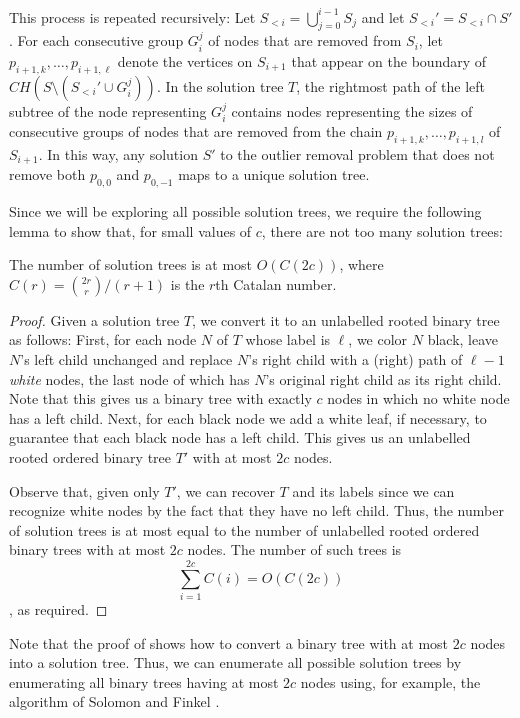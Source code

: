 \documentclass{elsart}
\begin{document}
This process is repeated recursively: Let
$S_{<i}=\bigcup_{j=0}^{i-1}S_j$ and let $S_{<i}'=S_{<i}\cap S'$.  For
each consecutive group $G_i^j$ of nodes that are removed from $S_i$,
let $p_{i+1,k}, \ldots, p_{i+1,\ell}$ denote the vertices on $S_{i+1}$
that appear on the boundary of $CH(S \setminus (S_{<i}'\cup G_i^j))$.
In the solution tree $T$, the rightmost path of the left subtree of
the node representing $G_i^j$ contains nodes representing the sizes of
consecutive groups of nodes that are removed from the chain
$p_{i+1,k}, \ldots, p_{i+1,l}$ of $S_{i+1}$.  In this way, any
solution $S'$ to the outlier removal problem that does not remove both
$p_{0,0}$ and $p_{0,-1}$ maps to a unique solution tree.

Since we will be exploring all possible solution trees, we require the
following lemma to show that, for small values of $c$, there are not
too many solution trees:
 
\begin{lem}
The number of solution trees is at most $O(C(2c))$, where
$C(r)={2r\choose r}/(r+1)$ is the $r$th Catalan number.
\end{lem}

\begin{proof} Given a solution tree $T$, we convert it to an
unlabelled rooted binary tree as follows: First, for each node $N$ of
$T$ whose label is $\ell$, we color $N$ black, leave $N$'s left child
unchanged and replace $N$'s right child with a (right) path of
$\ell-1$ \emph{white} nodes, the last node of which has $N$'s original
right child as its right child.  Note that this gives us a binary tree
with exactly $c$ nodes in which no white node has a left child.  Next,
for each black node we add a white leaf, if necessary, to guarantee
that each black node has a left child.  This gives us an unlabelled
rooted ordered binary tree $T'$ with at most $2c$ nodes.

Observe that, given only $T'$, we can recover $T$ and its labels since
we can recognize white nodes by the fact that they have no left child.
Thus, the number of solution trees is at most equal to the number of
unlabelled rooted ordered binary trees with at most $2c$ nodes.  The
number of such trees is 
\[
  \sum_{i=1}^{2c} C(i) = O(C(2c))
\]
\cite{knuth-graham-patashnik},
as required.
\end{proof}

Note that the proof of  shows how to convert a binary
tree with at most $2c$ nodes into a solution tree.  Thus, we can
enumerate all possible solution trees by enumerating all binary trees
having at most $2c$ nodes using, for example, the algorithm of Solomon
and Finkel \cite{sf80}.
\end{document}
